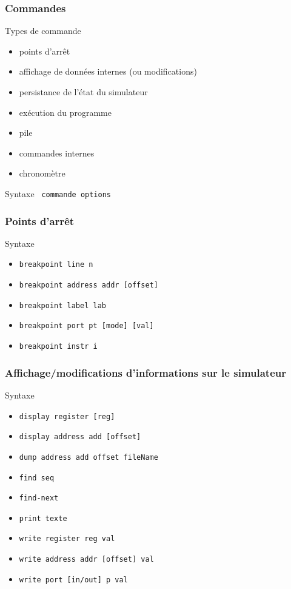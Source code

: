\documentclass{beamer}
\begin{document}
\begin{frame}[fragile]
	\frametitle{Commandes}
	
	\begin{block}{Types de commande}
		\begin{itemize}
		\item points d'arrêt
		\item affichage de données internes (ou modifications)
		\item persistance de l'état du simulateur
		\item exécution du programme
		\item pile
		\item commandes internes
		\item chronomètre
		\end{itemize}
	\end{block}
	
	\begin{block}{Syntaxe}
		\verb| commande options |
	\end{block}
	
\end{frame}

\begin{frame}[fragile]
	\frametitle{Points d'arrêt}
	\begin{block}{Syntaxe}
		\begin{itemize}
		\item \verb|breakpoint line n|
		\item \verb|breakpoint address addr [offset]|
		\item \verb|breakpoint label lab|
		\item \verb|breakpoint port pt [mode] [val]|
		\item \verb|breakpoint instr i|
		\end{itemize}
	\end{block}
\end{frame}

\begin{frame}[fragile]
	\frametitle{Affichage/modifications d'informations sur le simulateur}
	\begin{block}{Syntaxe}
		\begin{itemize}
		\item \verb|display register [reg]|
		\item \verb|display address add [offset] |
		\item \verb|dump address add offset fileName|
		\item \verb|find seq|
		\item \verb|find-next|
		\item \verb|print texte|
		\item \verb|write register reg val|
		\item \verb|write address addr [offset] val|
		\item \verb|write port [in/out] p val|
		\end{itemize}
	\end{block}
\end{frame}
	
\end{document}
